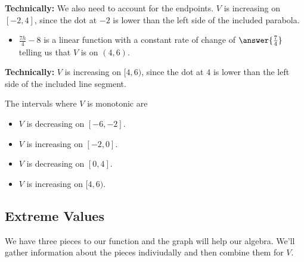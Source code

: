 \documentclass{ximera}
\begin{document}
\textbf{Technically:} We also need to account for the endpoints. $V$ is increasing on $[-2, 4]$, since the dot at $-2$ is lower than the left side of the included parabola.


\begin{question}
\begin{itemize}
\item \textbf{$\frac{7h}{4} - 8$} is a linear function with a constant rate of change of $\answer{\frac{7}{4}}$ telling us that $V$ is  on $(4, 6)$.
\end{itemize}
\end{question}

\textbf{Technically:} $V$ is increasing on $[4, 6)$, since the dot at $4$ is lower than the left side of the included line segment.


The intervals where $V$ is monotonic are

\begin{itemize}
\item $V$ is decreasing on $[-6,-2]$.
\item $V$ is increasing on $[-2,0]$.
\item $V$ is decreasing on $[0,4]$.
\item $V$ is increasing on $[4,6)$.
\end{itemize}









\subsection{Extreme Values} 


We have three pieces to our function and the graph will help our algebra. We'll gather information about the pieces indiviudally and then combine them for $V$.
\end{document}
